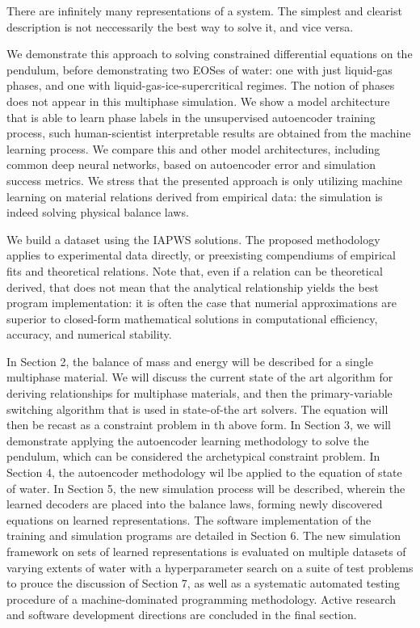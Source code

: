 \documentclass[]{article}
\begin{document}
There are infinitely many representations of a system. The simplest and clearist description is not neccessarily the best way
to solve it, and vice versa.


We demonstrate this approach to solving constrained differential
equations on the pendulum, before demonstrating two EOSes of water: one
with just liquid-gas phases, and one with liquid-gas-ice-supercritical
regimes. The notion of phases does not appear in this multiphase
simulation. We show a model architecture that is able to learn phase
labels in the unsupervised autoencoder training process, such
human-scientist interpretable results are obtained from the machine
learning process. We compare this and other model architectures,
including common deep neural networks, based on autoencoder error and
simulation success metrics. We stress that the presented approach is
only utilizing machine learning on material relations derived from
empirical data: the simulation is indeed solving physical balance laws.

We build a dataset using the IAPWS solutions. The proposed
methodology applies to experimental data directly, or preexisting
compendiums of empirical fits and theoretical relations.
Note that, even if a relation can be theoretical derived, that does
not mean that the analytical relationship yields the best program
implementation: it is often the case that numerial approximations are
superior to closed-form mathematical solutions in computational
efficiency, accuracy, and numerical stability.

In Section 2, the balance of mass and energy will be described for a
single multiphase material. We will discuss the current state of the
art algorithm for deriving relationships for multiphase materials, and
then the primary-variable switching algorithm that is used in
state-of-the art solvers. The equation will then be recast as a
constraint problem in th above form.
In Section 3, we will demonstrate applying the autoencoder learning
methodology to solve the pendulum,
which can be considered the archetypical constraint problem.
In Section 4, the autoencoder methodology wil lbe applied to the
equation of state of water. In Section 5, the new simulation process
will be described, wherein the learned decoders are placed into the
balance laws, forming newly discovered equations on learned
representations. The software implementation of the training and
simulation programs are detailed in Section 6. The new simulation
framework on sets of learned representations is evaluated on
multiple datasets of varying extents of water with a
hyperparameter search on a suite of test problems to prouce the discussion of Section 7, as
well as a systematic automated testing procedure of a
machine-dominated programming methodology.
Active research and software development directions are
concluded in the final section.
\end{document}
